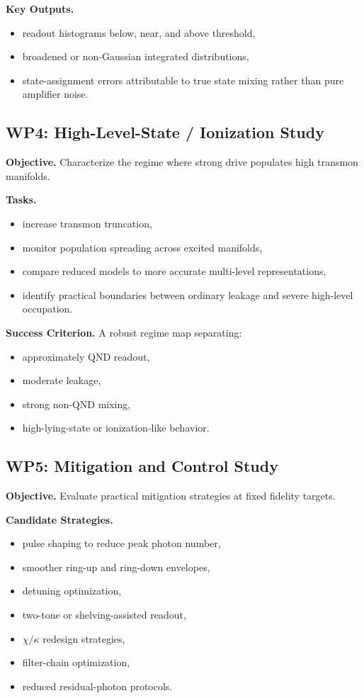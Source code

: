 \documentclass[11pt]{article}
\begin{document}
\textbf{Key Outputs.}
\begin{itemize}[leftmargin=2em]
    \item readout histograms below, near, and above threshold,
    \item broadened or non-Gaussian integrated distributions,
    \item state-assignment errors attributable to true state mixing rather than pure
    amplifier noise.
\end{itemize}

\subsection{WP4: High-Level-State / Ionization Study}

\textbf{Objective.} Characterize the regime where strong drive populates high transmon
manifolds.

\textbf{Tasks.}
\begin{itemize}[leftmargin=2em]
    \item increase transmon truncation,
    \item monitor population spreading across excited manifolds,
    \item compare reduced models to more accurate multi-level representations,
    \item identify practical boundaries between ordinary leakage and severe high-level
    occupation.
\end{itemize}

\textbf{Success Criterion.}
A robust regime map separating:
\begin{itemize}[leftmargin=2em]
    \item approximately QND readout,
    \item moderate leakage,
    \item strong non-QND mixing,
    \item high-lying-state or ionization-like behavior.
\end{itemize}

\subsection{WP5: Mitigation and Control Study}

\textbf{Objective.} Evaluate practical mitigation strategies at fixed fidelity targets.

\textbf{Candidate Strategies.}
\begin{itemize}[leftmargin=2em]
    \item pulse shaping to reduce peak photon number,
    \item smoother ring-up and ring-down envelopes,
    \item detuning optimization,
    \item two-tone or shelving-assisted readout,
    \item $\chi/\kappa$ redesign strategies,
    \item filter-chain optimization,
    \item reduced residual-photon protocols.
\end{itemize}
\end{document}
